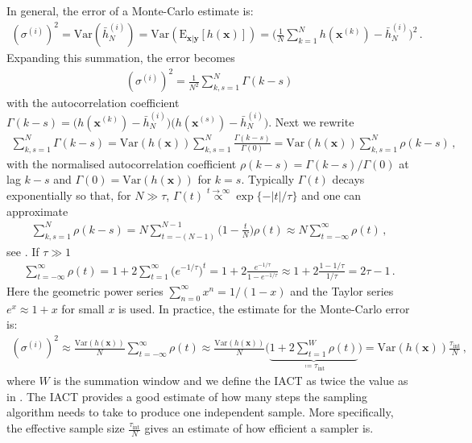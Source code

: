 In general, the error of a Monte-Carlo estimate is:
\begin{align}
	(\sigma^{(i)})^2 = \text{Var}(\bar{h}_N^{(i)}) =  \text{Var}(\text{E}_{\bm{x}|\bm{y}} [h(\bm{x})]) = \Bigg( \frac{1}{N} \sum_{k=1}^{N} h(\bm{x}^{(k)}) - \bar{h}_N^{(i)} \Bigg)^2 \, .
\end{align}
Expanding this summation, the error becomes
\begin{align}
	(\sigma^{(i)})^2 = \frac{1}{N^2} \sum_{k,s=1}^{N} \Gamma(k-s)
\end{align}
with the autocorrelation coefficient $\Gamma(k-s) =  \big( h(\bm{x}^{(k)}) -\bar{h}_N^{(i)} \big) \big(h(\bm{x}^{(s)}) - \bar{h}_N^{(i)}\big)$.
Next we rewrite
\begin{align}
	\sum_{k,s=1}^{N} \Gamma(k-s) = \text{Var}(h(\bm{x}))  \sum_{k,s=1}^{N} \frac{\Gamma(k-s)}{\Gamma(0)} =  \text{Var}(h(\bm{x})) \sum_{k,s=1}^{N}\rho(k-s)\, ,
\end{align}
with the normalised autocorrelation coefficient $\rho(k-s) =  \Gamma(k-s)/ \Gamma(0)$ at lag $k-s$ and $\Gamma(0) = \text{Var}(h(\bm{x}) )$ for $k=s$.
Typically $\Gamma(t)$ decays exponentially so that, for $N\gg \tau$, $\Gamma(t) \overset{t \rightarrow \infty }{ \propto} \exp\{ - |t| / \tau \}  $ and one can approximate
\begin{align}
	\sum_{k,s=1}^{N}\rho(k-s)  = N \sum_{t = -(N-1) }^{N-1} \Bigg(1- \frac{t}{N} \Bigg) \rho(t)  \approx N  \sum_{t = - \infty }^{\infty} \rho(t) \, ,
\end{align}
see \cite[p. 137]{Sokal1997}.
If $\tau \gg 1$
\begin{align}
	\sum_{t = - \infty }^{\infty} \rho(t) =  1 + 2 \sum_{t = 1}^{\infty} \big(e^{-1/ \tau}\big)^t =  1 + 2 \frac{e^{-1/ \tau} }{1 - e^{-1/ \tau}} \approx  1 + 2 \frac{1 -1/ \tau }{1/ \tau} =  2 \tau -1 \, .%
\end{align}
Here the geometric power series $\sum^{\infty}_{n=0} x^n= 1/ (1-x)$ and the Taylor series $ e^x \approx 1+x$ for small $x$ is used.
In practice, the estimate for the Monte-Carlo error is:
\begin{align}
	(\sigma^{(i)})^2   \approx \frac{\text{Var}(h(\bm{x}) )}{N} \sum_{t = - \infty }^{\infty} \rho(t)
	\approx \frac{\text{Var}(h(\bm{x}) )}{N} \Bigg( \underbrace{  1 + 2 \sum_{t = 1}^{W} \rho(t)  }_{ \coloneqq 	\tau_{\text{int}} }\Bigg) = \text{Var}(h(\bm{x})) \frac{ \tau_{\text{int}} }{N}\, ,
\end{align}
where $W$ is the summation window and we define the IACT as twice the value as in \cite[pp. 103-105]{wolff2002LecNot}.
The IACT provides a good estimate of how many steps the sampling algorithm needs to take to produce one independent sample.
More specifically, the effective sample size $\frac{ \tau_{\text{int}} }{N}$ gives an estimate of how efficient a sampler is.

